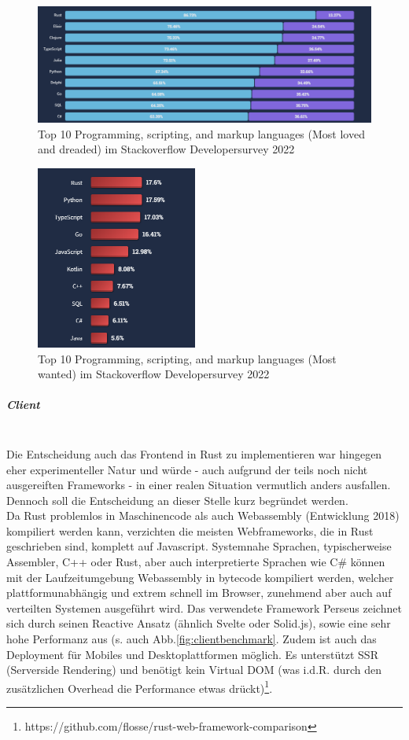 \documentclass[notitlepage, hidelinks]{article}
\begin{document}
\begin{figure}[H]
\centering
  \includegraphics[width=\textwidth]{images/devsurvey.png}
  \caption{Top 10 Programming, scripting, and markup languages (Most loved and dreaded) im Stackoverflow Developersurvey 2022}
  \label{devsurvey}
\end{figure}

\begin{figure}[H]
\centering
  \includegraphics[width=200px]{images/surveywanted.png}
  \caption{Top 10 Programming, scripting, and markup languages (Most wanted) im Stackoverflow Developersurvey 2022}
  \label{surveywanted}
\end{figure}

\subparagraph{Client} \mbox{} \\
Die Entscheidung auch das Frontend in Rust zu implementieren war hingegen eher experimenteller Natur und würde - auch aufgrund der teils noch nicht ausgereiften Frameworks - in einer realen Situation vermutlich anders ausfallen. Dennoch soll die Entscheidung an dieser Stelle kurz begründet werden. \\

Da Rust problemlos in Maschinencode als auch Webassembly (Entwicklung 2018) kompiliert werden kann, verzichten die meisten Webframeworks, die in Rust geschrieben sind, komplett auf Javascript. Systemnahe Sprachen, typischerweise Assembler, C++ oder Rust, aber auch interpretierte Sprachen wie C\# können mit der Laufzeitumgebung Webassembly in bytecode kompiliert werden, welcher plattformunabhängig und extrem schnell im Browser, zunehmend aber auch auf verteilten Systemen ausgeführt wird. Das verwendete Framework Perseus zeichnet sich durch seinen Reactive Ansatz (ähnlich Svelte oder Solid.js), sowie eine sehr hohe Performanz aus (s. auch Abb.\ref{fig:clientbenchmark}. Zudem ist auch das Deployment für Mobiles und Desktoplattformen möglich. Es unterstützt SSR (Serverside Rendering) und benötigt kein Virtual DOM (was i.d.R. durch den zusätzlichen Overhead die Performance etwas drückt)\footnote{https://github.com/flosse/rust-web-framework-comparison}. \\
\end{document}
